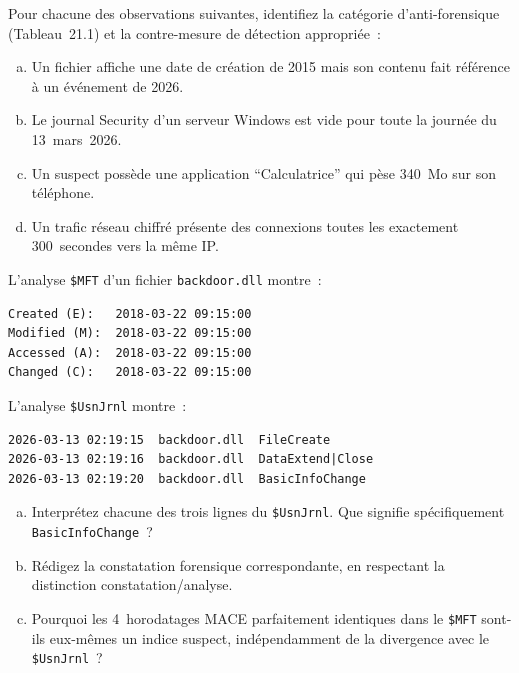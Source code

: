 \bigskip

\begin{boxexo}[title={\ding{45}\quad Exercice~21.1 --- Identifier les techniques \niveaubase}]
Pour chacune des observations suivantes, identifiez la catégorie
d'anti-forensique (Tableau~21.1) et la contre-mesure de détection
appropriée~:
\begin{enumerate}[(a)]
    \item Un fichier affiche une date de création de 2015 mais
          son contenu fait référence à un événement de 2026.
    \item Le journal Security d'un serveur Windows est vide pour
          toute la journée du 13~mars~2026.
    \item Un suspect possède une application ``Calculatrice''
          qui pèse 340~Mo sur son téléphone.
    \item Un trafic réseau chiffré présente des connexions toutes
          les exactement 300~secondes vers la même IP.
\end{enumerate}
\end{boxexo}

\begin{boxexo}[title={\ding{45}\quad Exercice~21.2 --- Détection de timestomping \niveaumoyen}]
L'analyse \texttt{\$MFT} d'un fichier \texttt{backdoor.dll} montre~:
\begin{lstlisting}[language=bash_forensique]
Created (E):   2018-03-22 09:15:00
Modified (M):  2018-03-22 09:15:00
Accessed (A):  2018-03-22 09:15:00
Changed (C):   2018-03-22 09:15:00
\end{lstlisting}
L'analyse \texttt{\$UsnJrnl} montre~:
\begin{lstlisting}[language=bash_forensique]
2026-03-13 02:19:15  backdoor.dll  FileCreate
2026-03-13 02:19:16  backdoor.dll  DataExtend|Close
2026-03-13 02:19:20  backdoor.dll  BasicInfoChange
\end{lstlisting}
\begin{enumerate}[(a)]
    \item Interprétez chacune des trois lignes du \texttt{\$UsnJrnl}.
          Que signifie spécifiquement \texttt{BasicInfoChange}~?
    \item Rédigez la constatation forensique correspondante,
          en respectant la distinction constatation/analyse.
    \item Pourquoi les 4~horodatages MACE parfaitement identiques
          dans le \texttt{\$MFT} sont-ils eux-mêmes un indice
          suspect, indépendamment de la divergence avec le
          \texttt{\$UsnJrnl}~?
\end{enumerate}
\end{boxexo}

